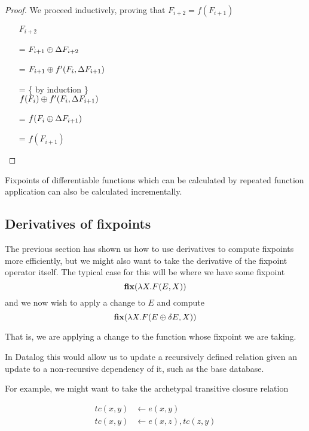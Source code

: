 \ifproofs
\begin{proof}
We proceed inductively, proving that $F_{i+2} = f(F_{i+1})$

\begin{itemize}
\item[ ]$F_{i+2}$
\item[=]
$
F_{i+1} \oplus \Delta F_{i+2}
$
\item[=]
$
F_{i+1} \oplus f'( F_i, \Delta F_{i+1})
$
\item[=] \{ by induction \}\\
$
f(F_i) \oplus f'(F_i, \Delta F_{i+1})
$
\item[=]
$
f(F_i \oplus \Delta F_{i+1})
$
\item[=]
$f(F_{i+1})$
\end{itemize}
\end{proof}
\fi

\begin{corollary}
\label{corollary:diffFP}
  Fixpoints of differentiable functions which can be calculated by repeated
  function application can also be calculated incrementally.
\end{corollary}

\subsection{Derivatives of fixpoints}
\label{sec:fixpointDerivatives}

The previous section has shown us how to use derivatives to compute fixpoints
more efficiently, but we might also want to take the derivative of the fixpoint
operator itself. The typical case for this will be where we have some fixpoint
$$\textbf{fix} (\lambda X . F(E, X))$$
and we now wish to apply a change to $E$ and compute
$$\textbf{fix} (\lambda X . F(E \oplus \delta E, X))$$

That is, we are applying a change to the function whose fixpoint we are taking.

In Datalog this would allow us to update a recursively defined relation given an
update to a non-recursive dependency of it, such as the base database.

For example, we might want to take the archetypal transitive closure relation

\begin{align*}
  tc(x, y) &\leftarrow e(x, y)\\
  tc(x, y) &\leftarrow e(x, z), tc(z, y)
\end{align*}

